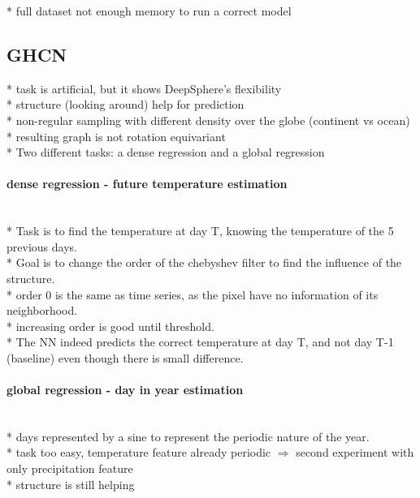 \documentclass{article} %
\begin{document}
* full dataset not enough memory to run a correct model


\subsection{GHCN}

* task is artificial, but it shows DeepSphere's flexibility\\
* structure (looking around) help for prediction\\

* non-regular sampling with different density over the globe (continent vs ocean)\\
* resulting graph is not rotation equivariant\\
* Two different tasks: a dense regression and a global regression\\

\paragraph*{dense regression - future temperature estimation}~\\
* Task is to find the temperature at day T, knowing the temperature of the 5 previous days.\\
* Goal is to change the order of the chebyshev filter to find the influence of the structure.\\
* order 0 is the same as time series, as the pixel have no information of its neighborhood.\\
* increasing order is good until threshold.\\
* The NN indeed predicts the correct temperature at day T, and not day T-1 (baseline) even though there is small difference.\\



\paragraph*{global regression - day in year estimation}~\\
* days represented by a sine to represent the periodic nature of the year.\\
* task too easy, temperature feature already periodic $\Rightarrow$ second experiment with only precipitation feature\\
* structure is still helping\\
\end{document}
